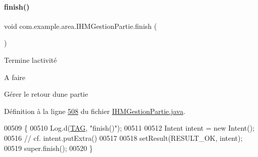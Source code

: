 \mbox{\label{classcom_1_1example_1_1area_1_1_i_h_m_gestion_partie_aafa9ce81364dbd851409ae0b38138e28}} 
\paragraph{\texorpdfstring{finish()}{finish()}}
{\footnotesize\ttfamily void com.\+example.\+area.\+I\+H\+M\+Gestion\+Partie.\+finish (\begin{DoxyParamCaption}{ }\end{DoxyParamCaption})}



Termine l\textquotesingle{}activité 

\begin{DoxyRefDesc}{A faire}
\item[\hyperlink{todo__todo000005}{A faire}]Gérer le retour d\textquotesingle{}une partie \end{DoxyRefDesc}


Définition à la ligne \hyperlink{_i_h_m_gestion_partie_8java_source_l00508}{508} du fichier \hyperlink{_i_h_m_gestion_partie_8java_source}{I\+H\+M\+Gestion\+Partie.\+java}.


\begin{DoxyCode}
00509     \{
00510         Log.d(\hyperlink{classcom_1_1example_1_1area_1_1_i_h_m_gestion_partie_a78af1eb84e4a48b7f69c3ebee193933c}{TAG}, \textcolor{stringliteral}{"finish()"});
00511 
00512         Intent intent = \textcolor{keyword}{new} Intent();
00516         \textcolor{comment}{// cf. intent.putExtra()}
00517 
00518         setResult(RESULT\_OK, intent);
00519         super.finish();
00520     \}
\end{DoxyCode}
\mbox{\label{classcom_1_1example_1_1area_1_1_i_h_m_gestion_partie_a26db1ff779d6ce415ab481dd79295115}} 
